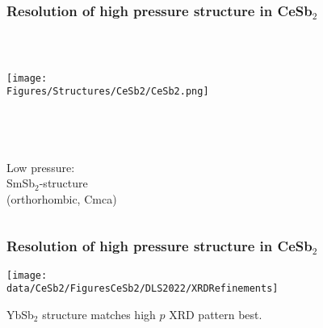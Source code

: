 \begin{frame}[label=CeSb2xray-2]
\frametitle{Resolution of high pressure structure in CeSb$_2$}
\begin{columns}[c]

\begin{column}{0.3\textwidth}
\centerline{~}
\centerline{\texttt{[image: \\Figures/Structures/CeSb2/CeSb2.png]}
}
\end{column}
\vrule{}
\end{columns}


\begin{columns}
\centerline{~}

\end{columns}

\begin{columns}
\begin{center}
Low pressure:\\
 SmSb$_2$-structure\\
(orthorhombic, Cmca)
\end{center}

\end{columns}
\end{frame}


\begin{frame}[label=CeSb2xray-2]
\frametitle{Resolution of high pressure structure in CeSb$_2$}

\centerline{\texttt{[image: \\data/CeSb2/FiguresCeSb2/DLS2022/XRDRefinements]}}

\centerline{YbSb$_2$ structure matches high $p$ XRD pattern best.}

\end{frame}
    

